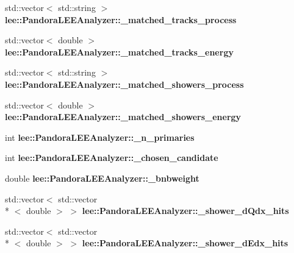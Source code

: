 \begin{DoxyCompactItemize}
\item 
\hypertarget{group__lee_gaf01f5331ecedef37034b5e8a12aac314}{std\-::vector$<$ std\-::string $>$ {\bfseries lee\-::\-Pandora\-L\-E\-E\-Analyzer\-::\-\_\-matched\-\_\-tracks\-\_\-process}}\label{group__lee_gaf01f5331ecedef37034b5e8a12aac314}

\item 
\hypertarget{group__lee_ga3cd167b0e0e259df8c58bed1190edd85}{std\-::vector$<$ double $>$ {\bfseries lee\-::\-Pandora\-L\-E\-E\-Analyzer\-::\-\_\-matched\-\_\-tracks\-\_\-energy}}\label{group__lee_ga3cd167b0e0e259df8c58bed1190edd85}

\item 
\hypertarget{group__lee_ga68fdfb9878716c7d99651a98e294818d}{std\-::vector$<$ std\-::string $>$ {\bfseries lee\-::\-Pandora\-L\-E\-E\-Analyzer\-::\-\_\-matched\-\_\-showers\-\_\-process}}\label{group__lee_ga68fdfb9878716c7d99651a98e294818d}

\item 
\hypertarget{group__lee_ga8c616d054941206de6a91e7859ac4209}{std\-::vector$<$ double $>$ {\bfseries lee\-::\-Pandora\-L\-E\-E\-Analyzer\-::\-\_\-matched\-\_\-showers\-\_\-energy}}\label{group__lee_ga8c616d054941206de6a91e7859ac4209}

\item 
\hypertarget{group__lee_ga9cb9605f2fe0af2464f936651659ad91}{int {\bfseries lee\-::\-Pandora\-L\-E\-E\-Analyzer\-::\-\_\-n\-\_\-primaries}}\label{group__lee_ga9cb9605f2fe0af2464f936651659ad91}

\item 
\hypertarget{group__lee_ga258cdf1c3fb847abc6f3aad95f8471d0}{int {\bfseries lee\-::\-Pandora\-L\-E\-E\-Analyzer\-::\-\_\-chosen\-\_\-candidate}}\label{group__lee_ga258cdf1c3fb847abc6f3aad95f8471d0}

\item 
\hypertarget{group__lee_ga9450f1c2fbd4efa3927094f9953c5041}{double {\bfseries lee\-::\-Pandora\-L\-E\-E\-Analyzer\-::\-\_\-bnbweight}}\label{group__lee_ga9450f1c2fbd4efa3927094f9953c5041}

\item 
\hypertarget{group__lee_gaa6b9f1a06dcc4c9b5e7ad66b2a5f3995}{std\-::vector$<$ std\-::vector\\*
$<$ double $>$ $>$ {\bfseries lee\-::\-Pandora\-L\-E\-E\-Analyzer\-::\-\_\-shower\-\_\-d\-Qdx\-\_\-hits}}\label{group__lee_gaa6b9f1a06dcc4c9b5e7ad66b2a5f3995}

\item 
\hypertarget{group__lee_ga8dc5bf5791d750d7481aa6a4051433d3}{std\-::vector$<$ std\-::vector\\*
$<$ double $>$ $>$ {\bfseries lee\-::\-Pandora\-L\-E\-E\-Analyzer\-::\-\_\-shower\-\_\-d\-Edx\-\_\-hits}}\label{group__lee_ga8dc5bf5791d750d7481aa6a4051433d3}


\end{DoxyCompactItemize}
